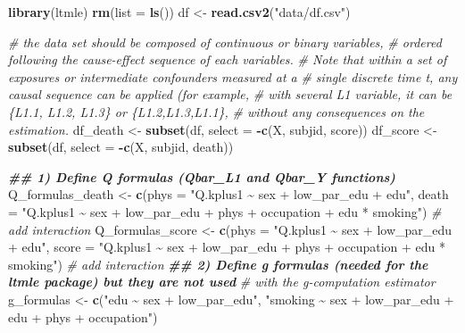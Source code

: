 \documentclass[
]{book}
\newenvironment{Shaded}{\begin{snugshade}}{\end{snugshade}}
\newcommand{\AttributeTok}[1]{\textcolor[rgb]{0.13,0.29,0.53}{#1}}
\newcommand{\CommentTok}[1]{\textcolor[rgb]{0.56,0.35,0.01}{\textit{#1}}}
\newcommand{\DocumentationTok}[1]{\textcolor[rgb]{0.56,0.35,0.01}{\textbf{\textit{#1}}}}
\newcommand{\FunctionTok}[1]{\textcolor[rgb]{0.13,0.29,0.53}{\textbf{#1}}}
\newcommand{\NormalTok}[1]{#1}
\newcommand{\OtherTok}[1]{\textcolor[rgb]{0.56,0.35,0.01}{#1}}
\newcommand{\SpecialCharTok}[1]{\textcolor[rgb]{0.81,0.36,0.00}{\textbf{#1}}}
\newcommand{\StringTok}[1]{\textcolor[rgb]{0.31,0.60,0.02}{#1}}
\begin{document}
\begin{Shaded}
\begin{Highlighting}[]
\FunctionTok{library}\NormalTok{(ltmle)}
\FunctionTok{rm}\NormalTok{(}\AttributeTok{list =} \FunctionTok{ls}\NormalTok{())}
\NormalTok{df }\OtherTok{\textless{}{-}} \FunctionTok{read.csv2}\NormalTok{(}\StringTok{"data/df.csv"}\NormalTok{)}

\CommentTok{\# the data set should be composed of continuous or binary variables,}
\CommentTok{\# ordered following the cause{-}effect sequence of each variables.}
\CommentTok{\# Note that within a set of exposures or intermediate confounders measured at a}
\CommentTok{\# single discrete time t, any causal sequence can be applied (for example,}
\CommentTok{\# with several L1 variable, it can be \{L1.1, L1.2, L1.3\} or \{L1.2,L1.3,L1.1\},}
\CommentTok{\# without any consequences on the estimation.}
\NormalTok{df\_death }\OtherTok{\textless{}{-}} \FunctionTok{subset}\NormalTok{(df, }\AttributeTok{select =} \SpecialCharTok{{-}}\FunctionTok{c}\NormalTok{(X, subjid, score))}
\NormalTok{df\_score }\OtherTok{\textless{}{-}} \FunctionTok{subset}\NormalTok{(df, }\AttributeTok{select =} \SpecialCharTok{{-}}\FunctionTok{c}\NormalTok{(X, subjid, death))}

\DocumentationTok{\#\# 1) Define Q formulas (Qbar\_L1 and Qbar\_Y functions)}
\NormalTok{Q\_formulas\_death }\OtherTok{\textless{}{-}} \FunctionTok{c}\NormalTok{(}\AttributeTok{phys =} \StringTok{"Q.kplus1 \textasciitilde{} sex + low\_par\_edu + edu"}\NormalTok{,}
                      \AttributeTok{death =} \StringTok{"Q.kplus1 \textasciitilde{} sex + low\_par\_edu + phys + occupation +}
\StringTok{                               edu * smoking"}\NormalTok{) }\CommentTok{\# add interaction}
\NormalTok{Q\_formulas\_score }\OtherTok{\textless{}{-}} \FunctionTok{c}\NormalTok{(}\AttributeTok{phys =} \StringTok{"Q.kplus1 \textasciitilde{} sex + low\_par\_edu + edu"}\NormalTok{,}
                    \AttributeTok{score =} \StringTok{"Q.kplus1 \textasciitilde{} sex + low\_par\_edu + phys + occupation +}
\StringTok{                             edu * smoking"}\NormalTok{) }\CommentTok{\# add interaction}
\DocumentationTok{\#\# 2) Define g formulas (needed for the ltmle package) but they are not used}
\CommentTok{\#    with the g{-}computation estimator}
\NormalTok{g\_formulas }\OtherTok{\textless{}{-}} \FunctionTok{c}\NormalTok{(}\StringTok{"edu \textasciitilde{} sex + low\_par\_edu"}\NormalTok{, }
                \StringTok{"smoking \textasciitilde{} sex + low\_par\_edu + edu + phys + occupation"}\NormalTok{)}


\end{Highlighting}
\end{Shaded}
\end{document}
